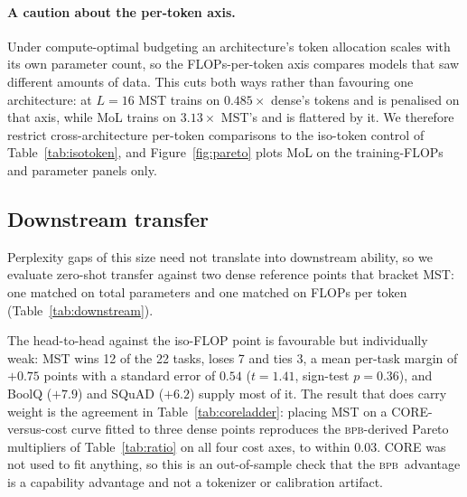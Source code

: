 \documentclass{article}
\newcommand{\bpb}{\textsc{bpb}}
\begin{document}
\paragraph{A caution about the per-token axis.} Under compute-optimal budgeting an
architecture's token allocation scales with its own parameter count, so the
FLOPs-per-token axis compares models that saw different amounts of data. This
cuts both ways rather than favouring one architecture: at $L{=}16$ MST trains on
$0.485\times$ dense's tokens and is penalised on that axis, while MoL trains on
$3.13\times$ MST's and is flattered by it. We therefore restrict cross-architecture
per-token comparisons to the iso-token control of
Table~\ref{tab:isotoken}, and Figure~\ref{fig:pareto} plots MoL on the
training-FLOPs and parameter panels only.

\subsection{Downstream transfer}

Perplexity gaps of this size need not translate into downstream ability, so we
evaluate zero-shot transfer against two dense reference points that bracket MST:
one matched on total parameters and one matched on FLOPs per token
(Table~\ref{tab:downstream}).

The head-to-head against the iso-FLOP point is favourable but individually weak:
MST wins 12 of the 22 tasks, loses 7 and ties 3, a mean per-task margin of
$+0.75$ points with a standard error of $0.54$ ($t=1.41$, sign-test $p=0.36$), and
BoolQ ($+7.9$) and SQuAD ($+6.2$) supply most of it. The result that does carry
weight is the agreement in Table~\ref{tab:coreladder}: placing MST on a CORE-versus-cost
curve fitted to three dense points reproduces the \bpb-derived Pareto multipliers of
Table~\ref{tab:ratio} on all four cost axes, to within $0.03$. CORE was not used to fit
anything, so this is an out-of-sample check that the \bpb\ advantage is a capability
advantage and not a tokenizer or calibration artifact.
\end{document}
